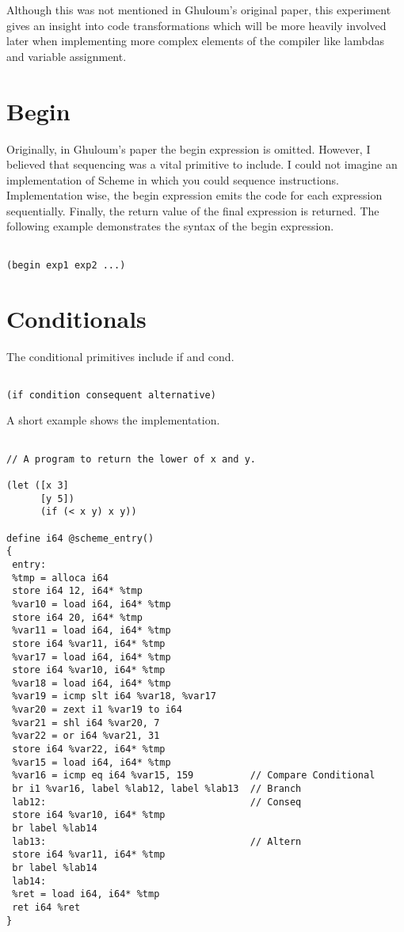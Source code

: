 \documentclass{article}
\begin{document}
Although this was not mentioned in Ghuloum's original paper, this experiment gives an insight into code transformations which will be more heavily involved later when implementing more complex elements of the compiler like lambdas and variable assignment.

\section{Begin}

Originally, in Ghuloum's paper the begin expression is omitted. However, I believed that sequencing was a vital primitive to include. I could not imagine an implementation of Scheme in which you could sequence instructions. Implementation wise, the begin expression emits the code for each expression sequentially. Finally, the return value of the final expression is returned. The following example demonstrates the syntax of the begin expression.

\begin{verbatim}

(begin exp1 exp2 ...) 

\end{verbatim}

\section{Conditionals}

The conditional primitives include if and cond. 

\begin{verbatim}

(if condition consequent alternative)

\end{verbatim}

A short example shows the implementation.

\begingroup
    \fontsize{8pt}{5pt}\selectfont
\begin{verbatim}

// A program to return the lower of x and y. 

(let ([x 3] 
      [y 5])
      (if (< x y) x y))

define i64 @scheme_entry()
{
 entry: 
 %tmp = alloca i64
 store i64 12, i64* %tmp
 %var10 = load i64, i64* %tmp
 store i64 20, i64* %tmp
 %var11 = load i64, i64* %tmp
 store i64 %var11, i64* %tmp
 %var17 = load i64, i64* %tmp
 store i64 %var10, i64* %tmp
 %var18 = load i64, i64* %tmp
 %var19 = icmp slt i64 %var18, %var17
 %var20 = zext i1 %var19 to i64
 %var21 = shl i64 %var20, 7
 %var22 = or i64 %var21, 31
 store i64 %var22, i64* %tmp
 %var15 = load i64, i64* %tmp
 %var16 = icmp eq i64 %var15, 159          // Compare Conditional
 br i1 %var16, label %lab12, label %lab13  // Branch
 lab12:                                    // Conseq
 store i64 %var10, i64* %tmp 
 br label %lab14                           
 lab13:                                    // Altern
 store i64 %var11, i64* %tmp 
 br label %lab14 
 lab14:
 %ret = load i64, i64* %tmp  
 ret i64 %ret
}
\end{verbatim}
\endgroup
\end{document}
